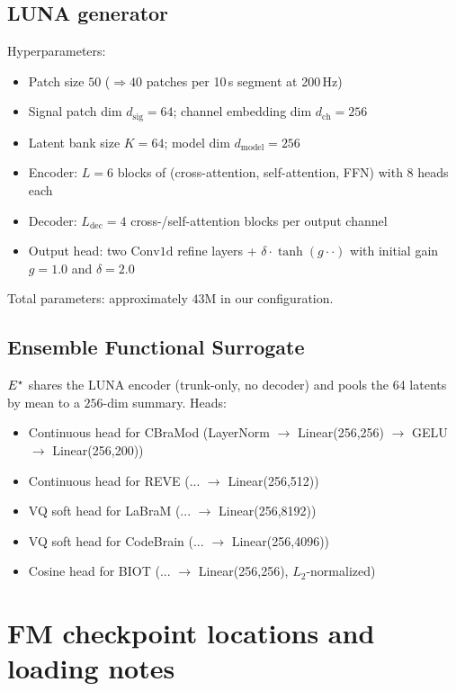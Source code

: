 \subsection{LUNA generator}
Hyperparameters:
\begin{itemize}[leftmargin=*,topsep=0pt,itemsep=0pt]
\item Patch size $50$ ($\!\Rightarrow\!40$ patches per 10\,s segment at 200\,Hz)
\item Signal patch dim $d_{\text{sig}}\!=\!64$; channel embedding dim $d_{\text{ch}}\!=\!256$
\item Latent bank size $K\!=\!64$; model dim $d_{\text{model}}\!=\!256$
\item Encoder: $L\!=\!6$ blocks of (cross-attention, self-attention, FFN) with 8 heads each
\item Decoder: $L_{\text{dec}}\!=\!4$ cross-/self-attention blocks per output channel
\item Output head: two $\mathrm{Conv1d}$ refine layers + $\delta\cdot\tanh(g\cdot\cdot)$ with initial gain $g\!=\!1.0$ and $\delta\!=\!2.0$
\end{itemize}
Total parameters: approximately $43\mathrm{M}$ in our configuration.

\subsection{Ensemble Functional Surrogate}
$E^{\star}$ shares the LUNA encoder (trunk-only, no decoder) and pools the 64 latents by mean to a $256$-dim summary. Heads:
\begin{itemize}[leftmargin=*,topsep=0pt,itemsep=0pt]
\item Continuous head for CBraMod (LayerNorm $\to$ Linear(256,256) $\to$ GELU $\to$ Linear(256,200))
\item Continuous head for REVE (... $\to$ Linear(256,512))
\item VQ soft head for LaBraM (... $\to$ Linear(256,8192))
\item VQ soft head for CodeBrain (... $\to$ Linear(256,4096))
\item Cosine head for BIOT (... $\to$ Linear(256,256), $L_2$-normalized)
\end{itemize}

\section{FM checkpoint locations and loading notes}
\label{app:fm_ckpts}

